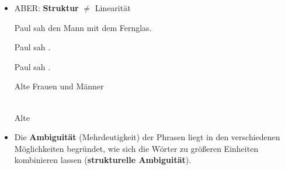 \begin{frame}

\begin{itemize}
	\item ABER: \textbf{Struktur} $\neq$ Linearität
	
	\ea Paul sah den Mann mit dem Fernglas.

\pause 
	
		\ea Paul sah .\\ 
		\vs 
		
		\ex Paul sah  .
		\z
	\z 

\pause 
	
	\ea Alte Frauen und Männer

\pause 
	
		\\
		\vs
		\ex Alte 
		\z
	\z 

\pause 

	\item Die \textbf{Ambiguität} (Mehrdeutigkeit) der Phrasen liegt in den verschiedenen Möglichkeiten begründet, wie sich die Wörter zu größeren Einheiten kombinieren lassen (\textbf{strukturelle Ambiguität}).

\end{itemize}

\end{frame}


